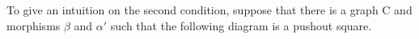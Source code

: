 \begin{center}
{
        }         
    \end{center}
To give an intuition on the second condition, suppose that there is a graph C and morphisms $\beta$ and $\alpha'$ such that the following diagram is a pushout square.
